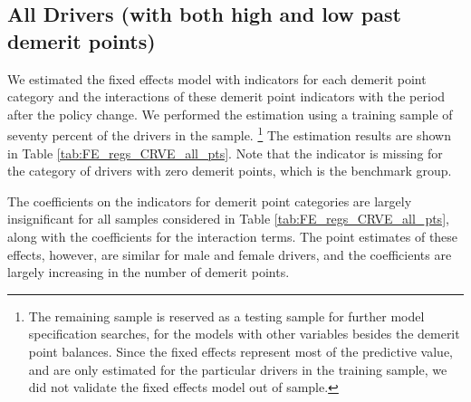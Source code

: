 \documentclass[12pt]{paper}
\begin{document}
\subsection*{All Drivers (with both high and low past demerit points)}

We estimated the fixed effects model with indicators for each demerit point category
and the interactions of these demerit point indicators with the period after the policy change. 
We performed the estimation using a training sample of seventy percent of the drivers in the sample.%
\footnote{The remaining sample is reserved as a testing sample for further model specification searches, for the models with other variables besides the demerit point balances. 
Since the fixed effects represent most of the predictive value, 
and are only estimated for the particular drivers in the training sample, 
we did not validate the fixed effects model out of sample. }
The estimation results are shown in Table \ref{tab:FE_regs_CRVE_all_pts}. 
% 
Note that the indicator is missing for the category of drivers with zero demerit points, 
which is the benchmark group.
% 



The coefficients on the indicators for demerit point categories are largely insignificant for all samples considered in Table \ref{tab:FE_regs_CRVE_all_pts}, 
along with the coefficients for the interaction terms. 
The point estimates of these effects, however, are similar for male and female drivers, 
and the coefficients are largely increasing in the number of demerit points. 



\end{document}
